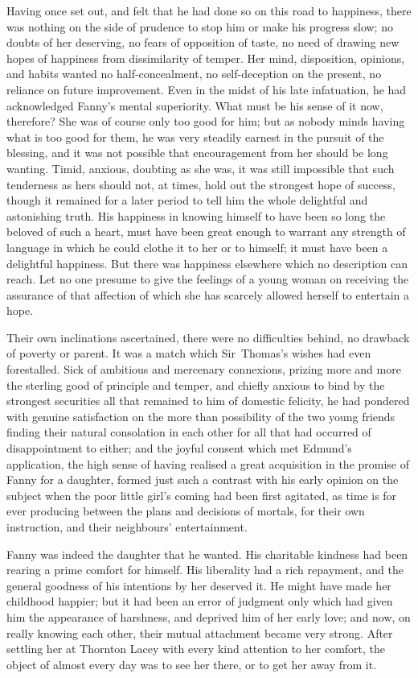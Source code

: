 Having once set out, and felt that he had done so on this road to happiness, there was nothing on the side of prudence to stop him or make his progress slow; no doubts of her deserving, no fears of opposition of taste, no need of drawing new hopes of happiness from dissimilarity of temper. Her mind, disposition, opinions, and habits wanted no half-concealment, no self-deception on the present, no reliance on future improvement. Even in the midst of his late infatuation, he had acknowledged Fanny's mental superiority. What must be his sense of it now, therefore? She was of course only too good for him; but as nobody minds having what is too good for them, he was very steadily earnest in the pursuit of the blessing, and it was not possible that encouragement from her should be long wanting. Timid, anxious, doubting as she was, it was still impossible that such tenderness as hers should not, at times, hold out the strongest hope of success, though it remained for a later period to tell him the whole delightful and astonishing truth. His happiness in knowing himself to have been so long the beloved of such a heart, must have been great enough to warrant any strength of language in which he could clothe it to her or to himself; it must have been a delightful happiness. But there was happiness elsewhere which no description can reach. Let no one presume to give the feelings of a young woman on receiving the assurance of that affection of which she has scarcely allowed herself to entertain a hope.

Their own inclinations ascertained, there were no difficulties behind, no drawback of poverty or parent. It was a match which Sir~Thomas's wishes had even forestalled. Sick of ambitious and mercenary connexions, prizing more and more the sterling good of principle and temper, and chiefly anxious to bind by the strongest securities all that remained to him of domestic felicity, he had pondered with genuine satisfaction on the more than possibility of the two young friends finding their natural consolation in each other for all that had occurred of disappointment to either; and the joyful consent which met Edmund's application, the high sense of having realised a great acquisition in the promise of Fanny for a daughter, formed just such a contrast with his early opinion on the subject when the poor little girl's coming had been first agitated, as time is for ever producing between the plans and decisions of mortals, for their own instruction, and their neighbours' entertainment.

Fanny was indeed the daughter that he wanted. His charitable kindness had been rearing a prime comfort for himself. His liberality had a rich repayment, and the general goodness of his intentions by her deserved it. He might have made her childhood happier; but it had been an error of judgment only which had given him the appearance of harshness, and deprived him of her early love; and now, on really knowing each other, their mutual attachment became very strong. After settling her at Thornton Lacey with every kind attention to her comfort, the object of almost every day was to see her there, or to get her away from it.


